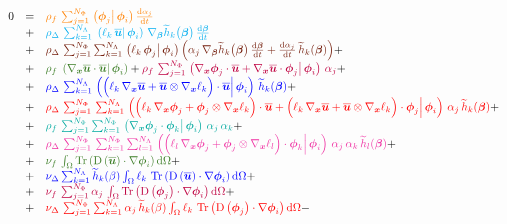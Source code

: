 \documentclass[10pt,a4paper]{article}
\begin{document}
\begin{equation}
\begin{array}{rcl}
0 &=& \textcolor{orange}{\rho_f \, \sum_{j=1}^{N_\Phi} \prodscal{\vphi_j}{\vphi_i}\dt{\alpha_j}} \\
&+&\textcolor{cyan}{ \rho_\Delta\,\sum_{k=1}^{N_\Lambda}\,  \prodscal{\ell_k \, \bu}{\vphi_i}\, \grad_{\vec \beta}\th_k \big(\vec \beta\big)\,\dt{\vec \beta}}\\
&+& \textcolor{Brown}{\rho_\Delta\,\sum_{j=1}^{N_\Phi} \sum_{k=1}^{N_\Lambda}  \prodscal{\ell_k\,\vphi_j}{\vphi_i} \Big(\alpha_j \,  \grad_{\vec \beta}\th_k \big(\vec \beta\big)\,\dt{\vec \beta}+ \dt{\alpha_j}\, \th_k(\vec \beta)\Big)} + \\
&+& \textcolor{OliveGreen}{\rho_f \, \prodscal{\grad_{\vx}\bu \cdot \bu}{\vphi_i}} + \textcolor{purple}{\rho_f \, \sum_{j=1}^{N_\Phi}  \prodscal{\grad_{\vx} \vphi_j\cdot \bu + \grad_{\vx}\bu\cdot \vphi_j }{\vphi_i} \,\alpha_j}  + \\
&+& \textcolor{blue}{\rho_\Delta\, \sum_{k=1}^{N_\Lambda}\prodscal{\Big( \ell_k \, \grad_{\vx}\bu+ \bu\otimes\grad_{\vx}\ell_k\Big)\cdot \bu}{\vphi_i}  \, \th_k (\vec \beta)}  + \\
&+& \textcolor{red}{\rho_\Delta\, \sum_{j=1}^{N_\Phi} \,\sum_{k=1}^{N_\Lambda} 
 \prodscal{\Big( \ell_k \, \grad_{\vx}\vphi_j+ \vphi_j \otimes\grad_{\vx}\ell_k\Big)\cdot \bu +  \Big( \ell_k \, \grad_{\vx}\bu+ \bu\otimes\grad_{\vx}\ell_k\Big) \cdot \vphi_j }{\vphi_i}\,\alpha_j \, \th_k (\vec \beta)} + \\
&+&  \textcolor{Emerald}{\rho_f \, \sum_{j=1}^{N_\Phi} \sum_{k=1}^{N_\Phi}  \prodscal{ \grad_{\vx} \vphi_j\cdot \vphi_k }{\vphi_i}\,\alpha_j \,\alpha_k}  + \\
&+& \textcolor{Rhodamine}{\rho_\Delta\, \sum_{j=1}^{N_\Phi} \,\sum_{k=1}^{N_\Phi} \sum_{l=1}^{N_\Lambda}
\prodscal{\Big( \ell_l \, \grad_{\vx}\vphi_j+ \vphi_j \otimes\grad_{\vx}\ell_l\Big)\cdot \vphi_k }{\vphi_i}\, \alpha_j \, \alpha_k \,\th_l (\vec \beta)} + \\
&+& \textcolor{OliveGreen}{\nu_f\,\int_\Omega\trace{\D{\bu}\cdot\grad \vphi_i}\d\Omega} + \\
&+&\textcolor{blue}{ \nu_{\Delta}\sum_{k=1}^{N_\Lambda} \th_k(\beta) \int_\Omega\ell_k \, \trace{\D{\bu}\cdot\grad \vphi_i}\d\Omega} + \\
 &+& \textcolor{purple}{\nu_f\,\sum_{j =1}^{N_\Phi}\alpha_j\,\int_\Omega \trace{\D{\vphi_j}\cdot\grad \vphi_i} \d \Omega} + \\
 &+&  \textcolor{red}{\nu_\Delta\,\sum_{j=1}^{N_\Phi} \sum_{k=1}^{N_\Lambda}  \alpha_j\,\th_k(\beta) \int_\Omega \ell_k \, \trace{\D{\vphi_j}\cdot\grad \vphi_i} \d \Omega} -\\

\end{array}
\end{equation}
\end{document}
